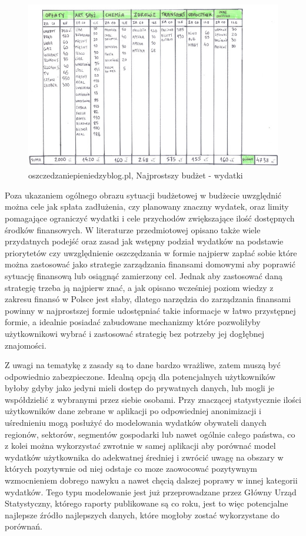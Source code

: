 \documentclass[a4paper,10pt, twoside]{report}
\begin{document}
\begin{figure}[H]           %
    \caption{oszczedzaniepieniedzyblog.pl, Najprostszy budżet - wydatki}
    \label{fig:}
    \centering  
    \includegraphics[width=12cm]{figures/oszczedzaniepieniedzyblog-pl_wydatki.jpg}
\end{figure}

{Poza ukazaniem ogólnego obrazu sytuacji budżetowej w budżecie uwzględnić można 
cele jak spłata zadłużenia, czy planowany znaczny wydatek, oraz limity 
pomagające ograniczyć wydatki i cele przychodów zwiększające ilość dostępnych 
środków finansowych. W literaturze przedmiotowej opisano także wiele przydatnych
 podejść oraz zasad jak wstępny podział wydatków na podstawie 
priorytetów\cite{najbogatszyczlowiekwbabilonie} czy uwzględnienie oszczędzania 
w formie najpierw zapłać sobie\cite{najbogatszyczlowiekwbabilonie}
\cite{finansowaforteca} które można zastosować jako strategie zarządzania 
finansami domowymi aby poprawić sytuację finansową lub osiągnąć zamierzony cel. 
Jednak aby zastosować daną strategię trzeba ją najpierw znać, a jak opisano 
wcześniej poziom wiedzy z zakresu finansó w Polsce jest słaby, dlatego narzędzia
 do zarządzania finansami powinny w najprostszej formie udostępniać takie 
informacje w łatwo przystępnej formie, a idealnie posiadać zabudowane mechanizmy
 które pozwoliłyby użytkownikowi wybrać i zastosować strategię bez potrzeby jej 
dogłębnej znajomości.}

{Z uwagi na tematykę z zasady są to dane bardzo wrażliwe, zatem muszą być 
odpowiednio zabezpieczone. Idealną opcją dla potencjalnych użytkowników byłoby 
gdyby jako jedyni mieli dostęp do prywatnych danych, lub mogli je współdzielić 
z wybranymi przez siebie osobami. Przy znaczącej statystycznie ilości 
użytkowników dane zebrane w aplikacji po odpowiedniej anonimizacji i 
uśrednieniu mogą posłużyć do modelowania wydatków obywateli danych regionów, 
sektorów, segmentów gospodarki lub nawet ogólnie całego państwa, co z kolei 
można wykorzystać zwrotnie w samej aplikacji aby porównać model wydatków 
użytkownika do adekwatnej średniej i zwrócić uwagę na obszary w których 
pozytywnie od niej odstaje co moze zaowocować pozytywnym wzmocnieniem dobrego 
nawyku a nawet chęcią dalszej poprawy w innej kategorii wydatków. Tego typu 
modelowanie jest już przeprowadzane przez Główny Urząd Statystyczny, którego 
raporty publikowane są co roku, jest to więc potencjalne najlepsze źródło 
najlepszych danych, które mogłoby zostać wykorzystane do porównań.}
\end{document}
